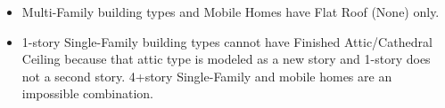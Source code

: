 \begin{itemize}
\item Multi-Family building types and Mobile Homes have Flat Roof (None) only.
\item 1-story Single-Family building types cannot have Finished Attic/Cathedral Ceiling because that attic type is modeled as a new story and 1-story does not a second story. 4+story Single-Family and mobile homes are an impossible combination.
\end{itemize}
